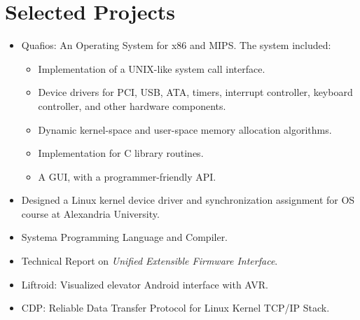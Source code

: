 \documentclass[letterpaper]{twentysecondcv} %
\begin{document}

\section{Selected Projects}

\begin{itemize}
    \item{Quafios: An Operating System for x86 and MIPS. The system included:
          \begin{itemize}
            \item Implementation of a UNIX-like system call interface.
            \item Device drivers for PCI, USB, ATA, timers, interrupt controller, 
                  keyboard controller, and other hardware components.
            \item Dynamic kernel-space and user-space memory allocation algorithms.
            \item Implementation for C library routines.
            \item A GUI, with a programmer-friendly API.
          \end{itemize}
          }

    \item{Designed a Linux kernel device driver and synchronization assignment 
          for OS course at Alexandria University.}
    \item{Systema Programming Language and Compiler.}
    \item{Technical Report on \textit{Unified Extensible Firmware Interface}.}
    \item{Liftroid: Visualized elevator Android interface with AVR.}
    \item{CDP: Reliable Data Transfer Protocol for Linux Kernel TCP/IP Stack.}
\end{itemize}
\end{document}
